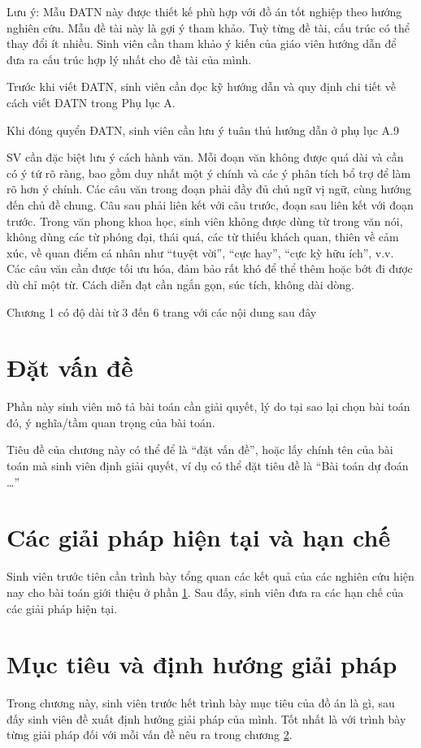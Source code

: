 \documentclass[../main.tex]{subfiles}
\begin{document}
Lưu ý: Mẫu ĐATN này được thiết kế phù hợp với đồ án tốt nghiệp theo hướng nghiên cứu. Mẫu đề tài này là gợi ý tham khảo. Tuỳ từng đề tài, cấu trúc có thể thay đổi ít nhiều. Sinh viên cần tham khảo ý kiến của giáo viên hướng dẫn để đưa ra cấu trúc hợp lý nhất cho đề tài của mình. 

Trước khi viết ĐATN, sinh viên cần đọc kỹ hướng dẫn và quy định chi tiết về cách viết ĐATN trong Phụ lục A. 

Khi đóng quyển ĐATN, sinh viên cần lưu ý tuân thủ hướng dẫn ở phụ lục A.9

SV cần đặc biệt lưu ý cách hành văn. Mỗi đoạn văn không được quá dài và cần có ý tứ rõ ràng, bao gồm duy nhất một ý chính và các ý phân tích bổ trợ để làm rõ hơn ý chính. Các câu văn trong đoạn phải đầy đủ chủ ngữ vị ngữ, cùng hướng đến chủ đề chung. Câu sau phải liên kết với câu trước, đoạn sau liên kết với đoạn trước. Trong văn phong khoa học, sinh viên không được dùng từ trong văn nói, không dùng các từ phóng đại, thái quá, các từ thiếu khách quan, thiên về cảm xúc, về quan điểm cá nhân như “tuyệt vời”, “cực hay”, “cực kỳ hữu ích”, v.v. Các câu văn cần được tối ưu hóa, đảm bảo rất khó để thể thêm hoặc bớt đi được dù chỉ một từ. Cách diễn đạt cần ngắn gọn, súc tích, không dài dòng.

Chương 1 có độ dài từ 3 đến 6 trang với các nội dung sau đây


\section{Đặt vấn đề}
\label{sec:dvd}
Phần này sinh viên mô tả bài toán cần giải quyết, lý do tại sao lại chọn bài toán đó, ý nghĩa/tầm quan trọng của bài toán.

Tiêu đề của chương này có thể để là ``đặt vấn đề'', hoặc lấy chính tên của bài toán mà sinh viên định giải quyết, ví dụ có thể đặt tiêu đề là ``Bài toán dự đoán …” 


\section{Các giải pháp hiện tại và hạn chế}
\label{sec:giaiphap}
Sinh viên trước tiên cần trình bày tổng quan các kết quả của các nghiên cứu hiện nay cho bài toán giới thiệu ở phần \ref{sec:dvd}. Sau đấy, sinh viên đưa ra các hạn chế của các giải pháp hiện tại. 

\section{Mục tiêu và định hướng giải pháp}
Trong chương này, sinh viên trước hết trình bày mục tiêu của đồ án là gì, sau đấy sinh viên đề xuất định hướng giải pháp của mình. Tốt nhất là với trình bày từng giải pháp đối với mỗi vấn đề nêu ra trong chương \ref{sec:giaiphap}. 
\end{document}
